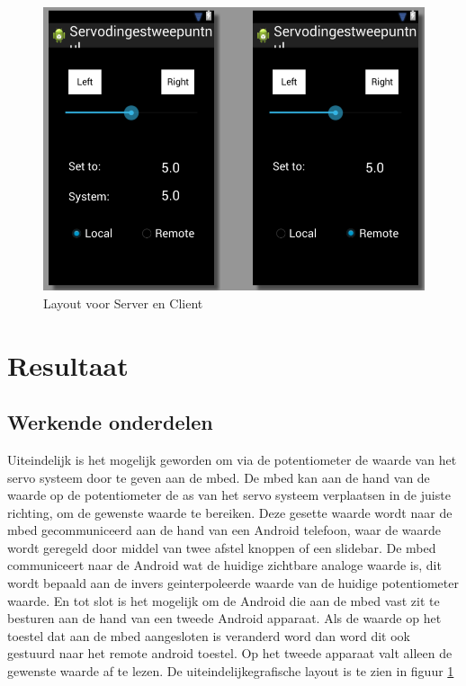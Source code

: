 \documentclass[a4paper]{article}
\begin{document}
	\begin{figure}
		\centering
		\includegraphics[scale=0.6]{imgs/layout3.png}
		\caption{Layout voor Server en Client}
		\label{fig:layout3}
	\end{figure}
	\newpage
	\section{Resultaat}
		\subsection{Werkende onderdelen}
			Uiteindelijk is het mogelijk geworden om via de potentiometer de waarde van het servo systeem door te geven aan de mbed. De mbed kan aan de hand van de waarde op de potentiometer de as van het servo systeem verplaatsen in de juiste richting, om de gewenste waarde te bereiken. Deze gesette waarde wordt naar de mbed gecommuniceerd aan de hand van een Android telefoon, waar de waarde wordt geregeld door middel van twee afstel knoppen of een slidebar. De mbed communiceert naar de Android wat de huidige zichtbare analoge waarde is, dit wordt bepaald aan de invers geinterpoleerde waarde van de huidige potentiometer waarde. En tot slot is het mogelijk om de Android die aan de mbed vast zit te besturen aan de hand van een tweede Android apparaat. Als de waarde op het toestel dat aan de mbed aangesloten is veranderd word dan word dit ook gestuurd naar het remote android toestel. Op het tweede apparaat valt alleen de gewenste waarde af te lezen. De uiteindelijkegrafische layout is te zien in figuur \ref{fig:layout3}
\end{document}
